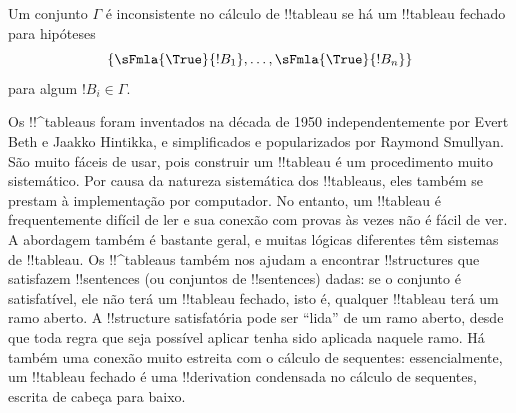 \documentclass[../../../include/open-logic-section]{subfiles}
\begin{document}
Um conjunto $\Gamma$ é inconsistente no cálculo de !!{tableau} se há
um !!{tableau} fechado para hipóteses
\[
\{\sFmla{\True}{!B_1}, \dots, \sFmla{\True}{!B_n}\} 
\]
para algum $!B_i \in \Gamma$.

Os !!^{tableau}s foram inventados na década de 1950 independentemente
por Evert Beth e Jaakko Hintikka, e simplificados e popularizados por
Raymond Smullyan. São muito fáceis de usar, pois construir um
!!{tableau} é um procedimento muito sistemático. Por causa da natureza
sistemática dos !!{tableau}s, eles também se prestam à implementação
por computador. No entanto, um !!{tableau} é frequentemente difícil de
ler e sua conexão com provas às vezes não é fácil de ver. A abordagem
também é bastante geral, e muitas lógicas diferentes têm sistemas de
!!{tableau}. Os !!^{tableau}s também nos ajudam a encontrar
!!{structure}s que satisfazem !!{sentence}s (ou conjuntos de
!!{sentence}s) dadas: se o conjunto é satisfatível, ele não terá um
!!{tableau} fechado, isto é, qualquer !!{tableau} terá um ramo aberto.
A !!{structure} satisfatória pode ser ``lida'' de um ramo aberto,
desde que toda regra que seja possível aplicar tenha sido aplicada
naquele ramo.  Há também uma conexão muito estreita com o cálculo de
sequentes: essencialmente, um !!{tableau} fechado é uma
!!{derivation} condensada no cálculo de sequentes, escrita de cabeça
para baixo.
\end{document}
